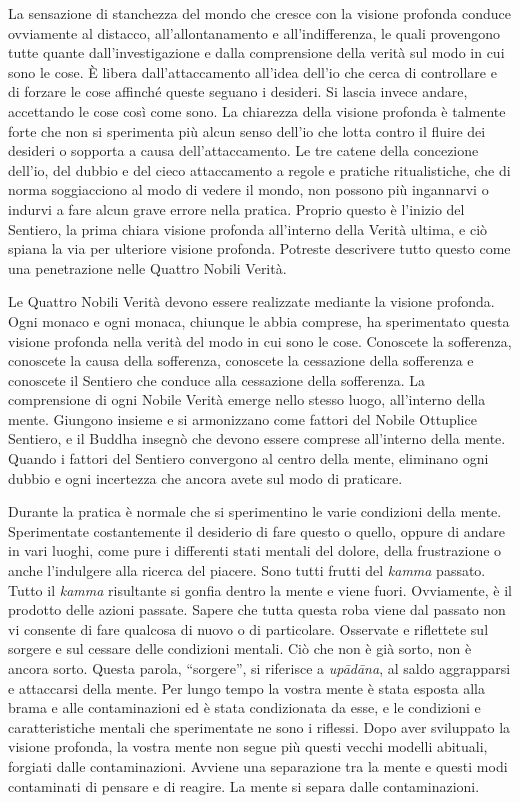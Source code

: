 La sensazione di stanchezza del mondo che cresce con la visione profonda
conduce ovviamente al distacco, all'allontanamento e all'indifferenza,
le quali provengono tutte quante dall'investigazione e dalla
comprensione della verità sul modo in cui sono le cose. È libera
dall'attaccamento all'idea dell'io che cerca di controllare e di forzare
le cose affinché queste seguano i desideri. Si lascia invece andare,
accettando le cose così come sono. La chiarezza della visione profonda è
talmente forte che non si sperimenta più alcun senso dell'io che lotta
contro il fluire dei desideri o sopporta a causa dell'attaccamento. Le
tre catene della concezione dell'io, del dubbio e del cieco attaccamento
a regole e pratiche ritualistiche, che di norma soggiacciono al modo di
vedere il mondo, non possono più ingannarvi o indurvi a fare alcun grave
errore nella pratica. Proprio questo è l'inizio del Sentiero, la prima
chiara visione profonda all'interno della Verità ultima, e ciò spiana la
via per ulteriore visione profonda. Potreste descrivere tutto questo
come una penetrazione nelle Quattro Nobili Verità.

Le Quattro Nobili Verità devono essere realizzate mediante la visione
profonda. Ogni monaco e ogni monaca, chiunque le abbia comprese, ha
sperimentato questa visione profonda nella verità del modo in cui sono
le cose. Conoscete la sofferenza, conoscete la causa della sofferenza,
conoscete la cessazione della sofferenza e conoscete il Sentiero che
conduce alla cessazione della sofferenza. La comprensione di ogni Nobile
Verità emerge nello stesso luogo, all'interno della mente. Giungono
insieme e si armonizzano come fattori del Nobile Ottuplice Sentiero, e
il Buddha insegnò che devono essere comprese all'interno della mente.
Quando i fattori del Sentiero convergono al centro della mente,
eliminano ogni dubbio e ogni incertezza che ancora avete sul modo di
praticare.

Durante la pratica è normale che si sperimentino le varie condizioni
della mente. Sperimentate costantemente il desiderio di fare questo o
quello, oppure di andare in vari luoghi, come pure i differenti stati
mentali del dolore, della frustrazione o anche l'indulgere alla ricerca
del piacere. Sono tutti frutti del \emph{kamma} passato. Tutto il
\emph{kamma} risultante si gonfia dentro la mente e viene fuori.
Ovviamente, è il prodotto delle azioni passate. Sapere che tutta questa
roba viene dal passato non vi consente di fare qualcosa di nuovo o di
particolare. Osservate e riflettete sul sorgere e sul cessare delle
condizioni mentali. Ciò che non è già sorto, non è ancora sorto. Questa
parola, ``sorgere'', si riferisce a \emph{upādāna}, al saldo aggrapparsi
e attaccarsi della mente. Per lungo tempo la vostra mente è stata
esposta alla brama e alle contaminazioni ed è stata condizionata da
esse, e le condizioni e caratteristiche mentali che sperimentate ne sono
i riflessi. Dopo aver sviluppato la visione profonda, la vostra mente
non segue più questi vecchi modelli abituali, forgiati dalle
contaminazioni. Avviene una separazione tra la mente e questi modi
contaminati di pensare e di reagire. La mente si separa dalle
contaminazioni.


